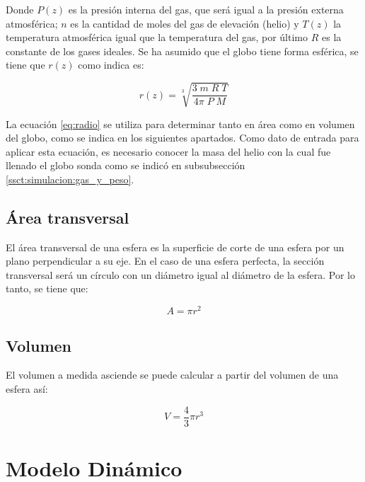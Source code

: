 Donde $ P(z) $ es la presión interna del gas, que será igual a la presión externa atmosférica;  $ n $ es la cantidad de moles del gas de elevación (helio) y $ T(z) $ la temperatura atmosférica igual que la temperatura del gas, por último $ R $ es la constante de los gases ideales.  Se ha asumido que el globo tiene forma esférica,  se  tiene que $r(z)$ como indica\cite{ascentRate_weatherBallon} es:

\begin{equation}
    \label{eq:radio}
    r(z) = \sqrt[3]{\frac{ 3 \; m \; R \; T }{ 4 \pi \; P \; M }}   
\end{equation}
 
La ecuación \ref{eq:radio} se utiliza para determinar tanto en área como en volumen del globo, como se indica en los siguientes apartados. Como dato de entrada para aplicar esta ecuación, es necesario conocer la masa del helio con la cual fue llenado el globo sonda como se indicó en subsubsección \ref{ssct:simulacion:gas_y_peso}.

\subsection{Área transversal}

El área transversal de una esfera es la superficie de corte de una esfera por un plano perpendicular a su eje. En el caso de una esfera perfecta, la sección transversal será un círculo con un diámetro igual al diámetro de la esfera. Por lo tanto, se tiene que:

\begin{equation}
    \label{eq:area_transversal}
    A = \pi r^{2}   
\end{equation}

\subsection{Volumen}
El volumen a medida asciende se puede calcular a partir del volumen de una esfera así:

\begin{equation}
    \label{eq:volumen}
    V  = \frac{4}{3} \pi r^{3}
\end{equation}

\newpage

\section{Modelo Dinámico} \label{sct:simulacion:modelo_dinamico}

